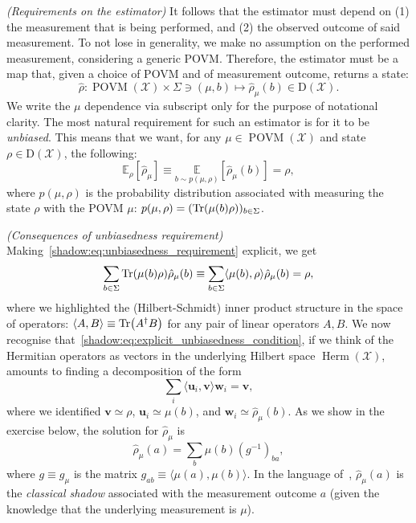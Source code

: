 \documentclass[12pt]{report}
\newcommand{\EE}{\mathbb{E}}
\newcommand{\on}[1]{\operatorname{#1}}
\newcommand{\bs}[1]{\boldsymbol{#1}}
\newcommand{\calX}{{\mathcal{X}}}
\newcommand{\rmD}{{\mathrm{D}}}
\newcommand{\heading}[1]{{\color{Mahogany}\emph{(#1)}}}
\DeclareMathOperator{\Herm}{Herm}
\begin{document}
\heading{Requirements on the estimator}
It follows that the estimator must depend on (1) the measurement that is being performed, and (2) the observed outcome of said measurement.
To not lose in generality, we make no assumption on the performed measurement, considering a generic POVM. Therefore, the estimator must be a map that, given a choice of POVM and of measurement outcome, returns a state:
\begin{equation}
	\hat\rho: \on{POVM}(\calX)\times \Sigma\ni (\mu,b)
	\mapsto \hat\rho_\mu(b) \in \rmD(\calX).
\end{equation}
We write the $\mu$ dependence via subscript only for the purpose of notational clarity.
The most natural requirement for such an estimator is for it to be \emph{unbiased}. This means that we want, for any $\mu\in\on{POVM}(\calX)$ and state $\rho\in\rmD(\calX)$, the following:
\begin{equation}\label{shadow:eq:unbiasedness_requirement}
	\EE_\rho[\hat\rho_\mu] \equiv
	\underset{b\sim p(\mu,\rho)}{\EE}[\hat\rho_\mu(b)] = \rho,
\end{equation}
where $p(\mu,\rho)$ is the probability distribution associated with measuring the state $\rho$ with the POVM $\mu$:
$p(\mu,\rho) = (\Tr(\mu(b)\rho))_{b\in\Sigma}$.

\heading{Consequences of unbiasedness requirement}
Making~\cref{shadow:eq:unbiasedness_requirement} explicit, we get
\begin{equation}\label{shadow:eq:explicit_unbiasedness_condition}
	\sum_{b\in\Sigma}
	\Tr(\mu(b) \rho) \hat\rho_\mu(b)
	\equiv \sum_{b\in\Sigma}
	\langle\mu(b),\rho\rangle\hat\rho_\mu(b) = \rho,
\end{equation}
where we highlighted the (Hilbert-Schmidt) inner product structure in the space of operators: $\langle A,B\rangle\equiv\Tr(A^\dagger B)$ for any pair of linear operators $A,B$.
We now recognise that~\cref{shadow:eq:explicit_unbiasedness_condition}, if we think of the Hermitian operators as vectors in the underlying Hilbert space $\Herm(\calX)$, amounts to finding a decomposition of the form
\begin{equation}
	\sum_i \langle \bs u_i, \bs v\rangle \bs w_i = \bs v,
\end{equation}
where we identified $\bs v\simeq\rho$, $\bs u_i\simeq \mu(b)$, and $\bs w_i\simeq \hat\rho_\mu(b)$.
As we show in the exercise below, the solution for $\hat\rho_\mu$ is
\begin{equation}
	\hat\rho_\mu(a) = \sum_b \mu(b) (g^{-1})_{ba},
\end{equation}
where $g\equiv g_\mu$ is the matrix $g_{ab}\equiv\langle\mu(a),\mu(b)\rangle$.
In the language of~\cite{huang2020predicting}, $\hat\rho_\mu(a)$ is the \emph{classical shadow} associated with the measurement outcome $a$ (given the knowledge that the underlying measurement is $\mu$).
\end{document}
